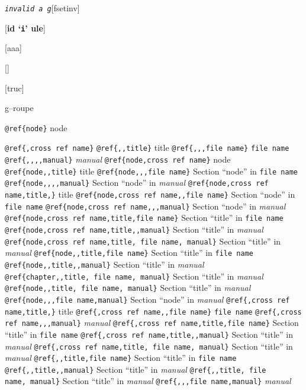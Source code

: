 \documentclass{book}
\newcommand\GNUTexinfocommandstyletextvar[1]{{\normalfont{}\textsl{#1}}}%
\begin{document}
%

\noindent\texttt{\GNUTexinfocommandstyletextvar{invalid} \EmbracOn{}\textnormal{\textsl{a g}}\EmbracOff{}}\hfill[fsetinv]



\index[fn]{invalid@\texttt{\GNUTexinfocommandstyletextvar{invalid}}}%
\noindent\texttt{}\hfill[\textbf{id `\texttt{i}' ule}]




\noindent\texttt{}\hfill[aaa]



\noindent\texttt{}\hfill[]



\noindent\texttt{}\hfill[truc]




g--roupe

\texttt{@ref\{node\}} node

\texttt{@ref\{,cross ref name\}} 
\texttt{@ref\{{,}{,}title\}} title
\texttt{@ref\{{,}{,},file name\}} \texttt{file name}
\texttt{@ref\{{,}{,}{,}{,}manual\}} \textsl{manual}
\texttt{@ref\{node,cross ref name\}} node
\texttt{@ref\{node{,}{,}title\}} title
\texttt{@ref\{node{,}{,},file name\}} Section ``node'' in \texttt{file name}
\texttt{@ref\{node{,}{,}{,}{,}manual\}} Section ``node'' in \textsl{manual}
\texttt{@ref\{node,cross ref name,title,\}} title
\texttt{@ref\{node,cross ref name{,}{,}file name\}} Section ``node'' in \texttt{file name}
\texttt{@ref\{node,cross ref name{,}{,},manual\}} Section ``node'' in \textsl{manual}
\texttt{@ref\{node,cross ref name,title,file name\}} Section ``title'' in \texttt{file name}
\texttt{@ref\{node,cross ref name,title{,}{,}manual\}} Section ``title'' in \textsl{manual}
\texttt{@ref\{node,cross ref name,title,\ file name,\ manual\}} Section ``title'' in \textsl{manual}
\texttt{@ref\{node{,}{,}title,file name\}} Section ``title'' in \texttt{file name}
\texttt{@ref\{node{,}{,}title{,}{,}manual\}} Section ``title'' in \textsl{manual}
\texttt{@ref\{chapter{,}{,}title,\ file name,\ manual\}} Section ``title'' in \textsl{manual}
\texttt{@ref\{node{,}{,}title,\ file name,\ manual\}} Section ``title'' in \textsl{manual}
\texttt{@ref\{node{,}{,},file name,manual\}} Section ``node'' in \textsl{manual}
\texttt{@ref\{,cross ref name,title,\}} title
\texttt{@ref\{,cross ref name{,}{,}file name\}} \texttt{file name}
\texttt{@ref\{,cross ref name{,}{,},manual\}} \textsl{manual}
\texttt{@ref\{,cross ref name,title,file name\}} Section ``title'' in \texttt{file name}
\texttt{@ref\{,cross ref name,title{,}{,}manual\}} Section ``title'' in \textsl{manual}
\texttt{@ref\{,cross ref name,title,\ file name,\ manual\}} Section ``title'' in \textsl{manual}
\texttt{@ref\{{,}{,}title,file name\}} Section ``title'' in \texttt{file name}
\texttt{@ref\{{,}{,}title{,}{,}manual\}} Section ``title'' in \textsl{manual}
\texttt{@ref\{{,}{,}title,\ file name,\ manual\}} Section ``title'' in \textsl{manual}
\texttt{@ref\{{,}{,},file name,manual\}} \textsl{manual}
\end{document}
